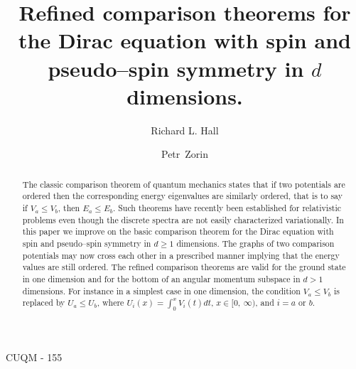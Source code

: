 \documentclass[amsmath,amssymb,superscriptaddress,showkeys, showpacs, aps, nofootinbib]{revtex4}
\begin{document}
\hspace*{4.5 in} CUQM - 155
\vspace{0.5 in}

\title{Refined comparison theorems for the Dirac equation with spin and pseudo--spin symmetry in $d$ dimensions.}

\author{Richard L. Hall}

\author{Petr~Zorin}

\begin{abstract} 
The classic comparison theorem of quantum mechanics states that if two potentials are ordered then the corresponding energy eigenvalues are similarly ordered, that is to say if $V_a\le V_b$, then $E_a\le E_b$. Such theorems have recently been established for relativistic problems even though the discrete spectra are not easily characterized variationally. In this paper we improve on the basic comparison theorem for the Dirac equation with spin and pseudo--spin symmetry in $d\ge 1$ dimensions. The graphs of two comparison potentials may now cross each other in a prescribed manner implying that the energy values are still ordered. The refined comparison theorems are valid for the ground state in one dimension and for the bottom of an angular momentum subspace in $d>1$ dimensions. For instance in a simplest case in one dimension, the condition $V_a\le V_b$ is replaced by $U_a\le U_b$, where $U_i(x)=\int_0^x V_i(t)dt$, $x\in[0,\ \infty)$, and $i=a$ or $b$. 
\end{abstract}



\maketitle
\end{document}
